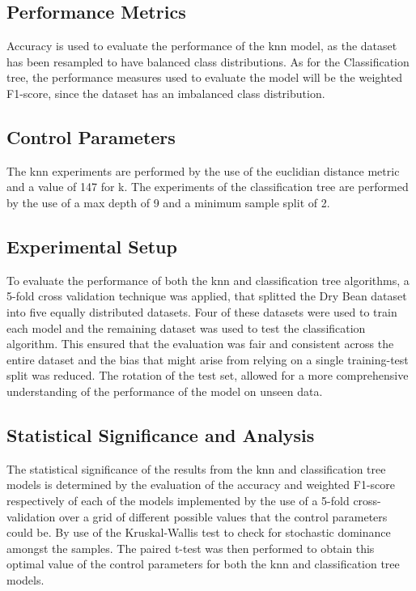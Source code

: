 \documentclass[10pt, conference]{IEEEtran}
\begin{document}
\subsection{Performance Metrics}

Accuracy is used to evaluate the performance of the \acrshort{knn} model, as the dataset has been
resampled to have balanced class distributions. As for the Classification tree, the performance
measures used to evaluate the model will be the weighted F1-score, since the dataset has an
imbalanced class distribution.

\subsection{Control Parameters}

The \acrshort{knn} experiments are performed by the use of the euclidian distance metric and a value of
147 for k. The experiments of the classification tree are performed by the use of a max depth of 9 and
a minimum sample split of 2.

\subsection{Experimental Setup}

To evaluate the performance of both the \acrshort{knn} and classification tree algorithms, a 5-fold cross
validation technique was applied, that splitted the Dry Bean dataset into five equally distributed datasets.
Four of these datasets were used to train each model and the remaining dataset was used to test the
classification algorithm. This ensured that the evaluation was fair and consistent across the entire dataset and
the bias that might arise from relying on a single training-test split was reduced. The rotation of the test set,
allowed for a more comprehensive understanding of the performance of the model on unseen data.

\subsection{Statistical Significance and Analysis}

The statistical significance of the results from the \acrshort{knn} and classification tree models is determined
by the evaluation of the accuracy and weighted F1-score respectively of each of the models implemented by the use
of a 5-fold cross-validation over a grid of different possible values that the control parameters could be. By use of the Kruskal-Wallis
test to check for stochastic dominance amongst the samples. The paired t-test was then performed to obtain this optimal value of the
control parameters for both the \acrshort{knn} and classification tree models.
\end{document}
